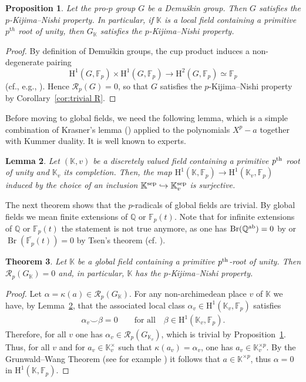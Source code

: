\documentclass{amsart}
\newtheorem{thm}{Theorem}[section]
\newtheorem{prop}[thm]{Proposition}
\newtheorem{lem}[thm]{Lemma}
\theoremstyle{definition}
\theoremstyle{remark}
\DeclareMathOperator{\Br}{Br}
\newcommand{\KK}{\mathbb{K}}
\newcommand{\QQ}{\mathbb{Q}}
\newcommand{\FF}{\mathbb{F}}
\newcommand{\calR}{\mathcal{R}}
\newcommand{\rmH}{\mathrm H}%
\newcommand{\F}{\FF}
\begin{document}
\begin{prop}\label{prop:Demushkin KN}
 Let the pro-$p$ group $G$ be a Demu\v{s}kin group.
 Then $G$ satisfies the $p$-Kijima--Nishi property.
 In particular, if $\KK$ is a local field containing a primitive $p^{\mathrm th}$ root of unity, then $G_{\KK}$ satisfies the $p$-Kijima--Nishi property.
\end{prop}

\begin{proof}
 By definition of Demu\v{s}kin groups, the cup product induces a non-degenerate pairing
 \[
  \rmH^1(G,\F_p)\times\rmH^1(G,\F_p)\longrightarrow\rmH^2(G,\F_p)\simeq\FF_p
 \]
(cf., e.g., \cite[Def.~3.9.9]{NSW2008}).
Hence $\calR_p(G)=0$, so that $G$ satisfies the $p$-Kijima--Nishi property by Corollary~\ref{cor:trivial R}.
\end{proof}
Before moving to global fields, we need the following lemma, which is a simple combination of Krasner's lemma (\cite[Lem. 12.1.1]{NSW2008}) applied to the polynomials $X^p-a$ together with Kummer duality. It is well known to experts.
\begin{lem}
\label{lem:Krasner cohomology}
    Let $(\KK,v)$ be a discretely valued field containing a primitive $p^{\rm th}$ root of unity and $\KK_v$ its completion. Then, the map $\rmH^1(\KK,\FF_p)\to \rmH^1(\KK_v,\FF_p)$ induced by the choice of an inclusion  $\KK^{\rm sep}\hookrightarrow \KK^{\rm sep}_{v}$ is surjective.
\end{lem}


The next theorem shows that the $p$-radicals of global fields are trivial. By global fields we mean finite extensions of $\QQ$ or $\FF_p(t)$. Note that for infinite extensions of $\QQ$ or $\FF_p(t)$ the statement is not true anymore, as one has $\Br(\QQ^{\rm ab})=0$ by \cite[\S 3.3 Prop. 9]{serre:galc} or $\Br(\bar{\FF_p}(t))=0$ by Tsen's theorem (cf. \cite[Thm. 6.2.8]{GilleSzamuely}).

\begin{thm}
\label{thm:Gloabal field trivial radical}
    Let $\KK$ be a global field containing a primitive $p^{\rm th}$-root of unity. Then $\calR_p(G_{\KK})=0$ and, in particular, $\KK$ has the $p$-Kijima--Nishi property.
\end{thm}
\begin{proof}
    Let $\alpha=\kappa(a)\in \calR_p(G_{\KK})$. For any non-archimedean place $v$ of $\KK$ we have, by Lemma~\ref{lem:Krasner cohomology}, that the associated local class $\alpha_v\in \rmH^1(\KK_v,\FF_p)$ satisfies
    \begin{align*}
        \alpha_v\smallsmile \beta =0 \qquad \text{for all}\quad \beta\in \rmH^1(\KK_v,\FF_p).
    \end{align*}
    Therefore, for all $v$ one has $\alpha_v\in \calR_p(G_{{\KK}_v})$, which is trivial by Proposition~\ref{prop:Demushkin KN}. Thus, for all $v$ and for $a_v\in\KK_v^\times$ such that $\kappa(a_v)=\alpha_v$, one has $a_v\in\KK_v^{\times p}$. By the Grunwald--Wang Theorem (see for example \cite[Thm.~IX.1]{ArtinTate2009}) it follows that $a\in \KK^{\times p}$, thus $\alpha=0$ in $\rmH^1(\KK,\FF_p)$.
\end{proof}
\end{document}
